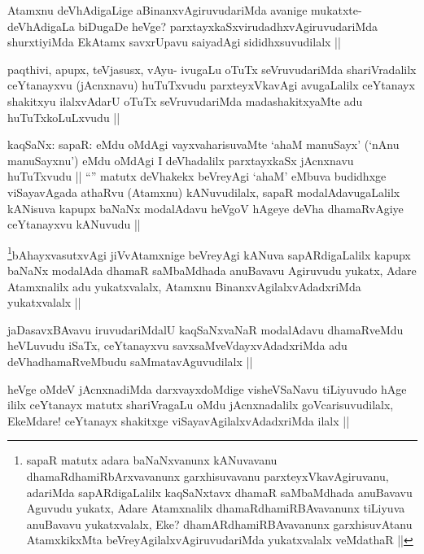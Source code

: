 \begin{artha}
Atamxnu deVhAdigaLige aBinanxvAgiruvudariMda avanige mukatxte- deVhAdigaLa biDugaDe heVge? parxtayxkaSxvirudadhxvAgiruvudariMda shurxtiyiMda EkAtamx savxrUpavu saiyadAgi sididhxsuvudilalx ||
\end{artha}

\begin{artha}
paqthivi, apupx, teVjasusx, vAyu- ivugaLu oTuTx seVruvudariMda shariVradalilx ceYtanayxvu (jAcnxnavu) huTuTxvudu parxteyxVkavAgi avugaLalilx ceYtanayx shakitxyu ilalxvAdarU oTuTx seVruvudariMda madashakitxyaMte adu huTuTxkoLuLxvudu ||
\end{artha}

\begin{artha}
kaqSaNx: sapaR: eMdu oMdAgi vayxvaharisuvaMte `ahaM manuSayx' (`nAnu manuSayxnu') eMdu oMdAgi I deVhadalilx parxtayxkaSx jAcnxnavu huTuTxvudu ||
``\stext'' matutx deVhakekx beVreyAgi `ahaM' eMbuva budidhxge viSayavAgada athaRvu (Atamxnu) kANuvudilalx, sapaR modalAdavugaLalilx kANisuva kapupx baNaNx modalAdavu heVgoV hAgeye deVha dhamaRvAgiye ceYtanayxvu kANuvudu ||
\end{artha}

\begin{artha}
\footnote{sapaR matutx adara baNaNxvanunx kANuvavanu dhamaRdhamiRbArxvavanunx garxhisuvavanu parxteyxVkavAgiruvanu, adariMda sapARdigaLalilx kaqSaNxtavx dhamaR saMbaMdhada anuBavavu Aguvudu yukatx, Adare Atamxnalilx dhamaRdhamiRBAvavanunx tiLiyuva anuBavavu yukatxvalalx, Eke? dhamARdhamiRBAvavanunx garxhisuvAtanu AtamxkikxMta beVreyAgilalxvAgiruvudariMda yukatxvalalx veMdathaR ||}bAhayxvasutxvAgi jiVvAtamxnige beVreyAgi kANuva sapARdigaLalilx kapupx baNaNx modalAda dhamaR saMbaMdhada anuBavavu Agiruvudu yukatx, Adare Atamxnalilx adu yukatxvalalx, Atamxnu BinanxvAgilalxvAdadxriMda yukatxvalalx ||
\end{artha}

\begin{artha}
jaDasavxBAvavu iruvudariMdalU kaqSaNxvaNaR modalAdavu dhamaRveMdu heVLuvudu iSaTx, ceYtanayxvu savxsaMveVdayxvAdadxriMda adu deVhadhamaRveMbudu saMmatavAguvudilalx ||
\end{artha}

\begin{artha}
heVge oMdeV jAcnxnadiMda darxvayxdoMdige visheVSaNavu tiLiyuvudo hAge ililx ceYtanayx matutx shariVragaLu oMdu jAcnxnadalilx goVcarisuvudilalx, EkeMdare! ceYtanayx shakitxge viSayavAgilalxvAdadxriMda ilalx ||
\end{artha}

